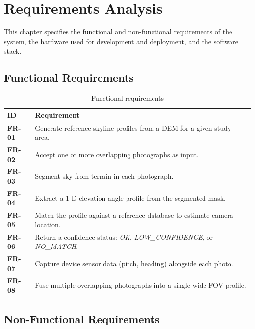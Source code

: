 \chapter{Requirements Analysis}
\label{chap:requirements}

This chapter specifies the functional and non-functional requirements of the system, the hardware used for development and deployment, and the software stack.

\section{Functional Requirements}

\begin{table}[H]
\centering
\caption{Functional requirements}
\label{tab:functional_requirements}
\begin{tabularx}{0.95\textwidth}{>{\bfseries}l X}
\toprule
ID & Requirement \\
\midrule
FR-01 & Generate reference skyline profiles from a DEM for a given study area. \\
FR-02 & Accept one or more overlapping photographs as input. \\
FR-03 & Segment sky from terrain in each photograph. \\
FR-04 & Extract a 1-D elevation-angle profile from the segmented mask. \\
FR-05 & Match the profile against a reference database to estimate camera location. \\
FR-06 & Return a confidence status: \textit{OK}, \textit{LOW\_CONFIDENCE}, or \textit{NO\_MATCH}. \\
FR-07 & Capture device sensor data (pitch, heading) alongside each photo. \\
FR-08 & Fuse multiple overlapping photographs into a single wide-FOV profile. \\
\bottomrule
\end{tabularx}
\end{table}

\section{Non-Functional Requirements}

